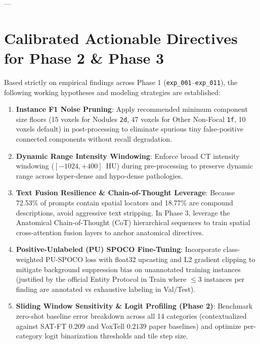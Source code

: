 \documentclass[11pt,a4paper]{article}
\begin{document}
---

\section{Calibrated Actionable Directives for Phase 2 \& Phase 3}

Based strictly on empirical findings across Phase 1 (\texttt{exp\_001}--\texttt{exp\_011}), the following working hypotheses and modeling strategies are established:
\begin{enumerate}
    \item \textbf{Instance F1 Noise Pruning}: Apply recommended minimum component size floors (15 voxels for Nodules \texttt{2d}, 47 voxels for Other Non-Focal \texttt{1f}, 10 voxels default) in post-processing to eliminate spurious tiny false-positive connected components without recall degradation.
    \item \textbf{Dynamic Range Intensity Windowing}: Enforce broad CT intensity windowing ($\left[-1024, +400\right]$~HU) during pre-processing to preserve dynamic range across hyper-dense and hypo-dense pathologies.
    \item \textbf{Text Fusion Resilience \& Chain-of-Thought Leverage}: Because 72.53\% of prompts contain spatial locators and 18.77\% are compound descriptions, avoid aggressive text stripping. In Phase 3, leverage the Anatomical Chain-of-Thought (CoT) hierarchical sequences to train spatial cross-attention fusion layers to anchor anatomical directives.
    \item \textbf{Positive-Unlabeled (PU) SPOCO Fine-Tuning}: Incorporate class-weighted PU-SPOCO loss with float32 upcasting and L2 gradient clipping to mitigate background suppression bias on unannotated training instances (justified by the official Entity Protocol in Train where $\le 3$ instances per finding are annotated vs exhaustive labeling in Val/Test).
    \item \textbf{Sliding Window Sensitivity \& Logit Profiling (Phase 2)}: Benchmark zero-shot baseline error breakdown across all 14 categories (contextualized against SAT-FT $0.209$ and VoxTell $0.2139$ paper baselines) and optimize per-category logit binarization thresholds and tile step size.
\end{enumerate}
\end{document}
